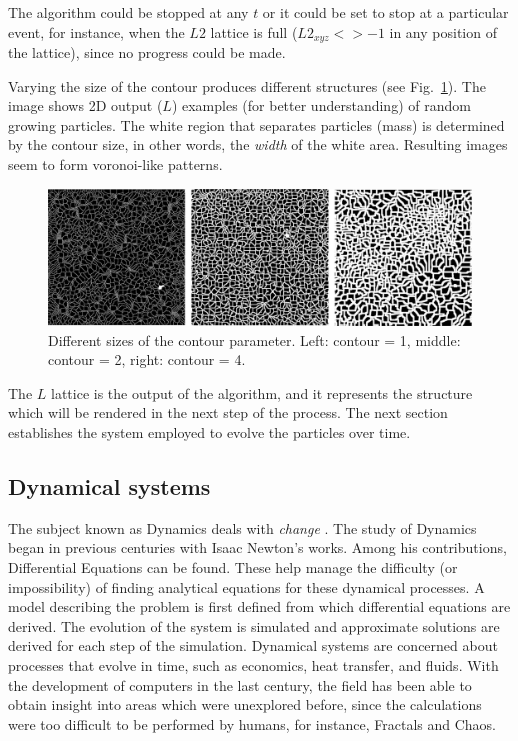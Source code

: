 \documentclass[oneside,a4paper,english,links]{amca}
\begin{document}
The algorithm could be stopped at any $t$ or it could be set to stop at a particular event, for instance, when the $L2$ lattice is full ($L2_{xyz} <> -1$ in any position of the lattice), since no progress could be made.

Varying the size of the contour produces different structures (see Fig.~\ref{fg:fig1}). The image shows 2D output ($L$) examples (for better understanding) of random growing particles. The white region that separates particles (mass) is determined by the contour size, in other words, the {\em width} of the white area. Resulting images seem to form voronoi-like patterns.


\begin{figure}[htb!]
  \centerline{\includegraphics[scale=0.22]{fig1.pdf}}
  \caption{Different sizes of the contour parameter. Left: contour = 1, middle: contour = 2, right: contour = 4.}
  \label{fg:fig1}
\end{figure}

The $L$ lattice is the output of the algorithm, and it represents the
structure which will be rendered in the next step of the process. The
next section establishes the system employed to evolve the particles
over time.

\subsection{Dynamical systems}

The subject known as Dynamics deals with {\em change}
\citep{Strogatz2001}. The study of Dynamics began in previous
centuries with Isaac Newton's works. Among his contributions,
Differential Equations can be found. These help manage the
difficulty (or impossibility) of finding analytical equations for
these dynamical processes. A model describing the problem is
first defined from which differential equations are derived. The
evolution of the system is simulated and approximate solutions are
derived for each step of the simulation. Dynamical systems are
concerned about processes that evolve in time, such as economics, heat
transfer, and fluids. With the development of computers in the last
century, the field has been able to obtain insight into areas which
were unexplored before, since the calculations were too difficult to
be performed by humans, for instance, Fractals \citep{Mandelbrot83}
and Chaos.
\end{document}

